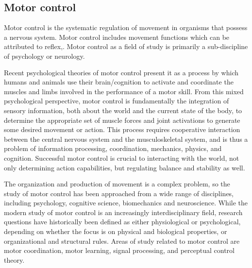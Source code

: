 \subsection{Motor control}
Motor control is the systematic regulation of movement in organisms that possess 
a nervous system. Motor control includes movement functions which can be attributed 
to reflex,\cite{BehaviorlaStudy1964}. Motor control as a field of study is primarily a sub-discipline of 
psychology or neurology.

Recent psychological theories of motor control present it as a process by which 
humans and animals use their brain/cognition to activate and coordinate the muscles 
and limbs involved in the performance of a motor skill. From this mixed psychological 
perspective, motor control is fundamentally the integration of sensory information, 
both about the world and the current state of the body, to determine the appropriate 
set of muscle forces and joint activations to generate some desired movement or action. 
This process requires cooperative interaction between the central nervous system and 
the musculoskeletal system, and is thus a problem of information processing, 
coordination, mechanics, physics, and cognition.\cite{RoboticMovement, EnhanceEmpiri2011} Successful motor control 
is crucial to interacting with the world, not only determining action capabilities, 
but regulating balance and stability as well.

The organization and production of movement is a complex problem, so the study of 
motor control has been approached from a wide range of disciplines, including 
psychology, cognitive science, biomechanics and neuroscience. While the modern 
study of motor control is an increasingly interdisciplinary field, research 
questions have historically been defined as either physiological or psychological, 
depending on whether the focus is on physical and biological properties, or 
organizational and structural rules.\cite{DOMER2011} Areas of study related to motor control 
are motor coordination, motor learning, signal processing, and perceptual control 
theory.


